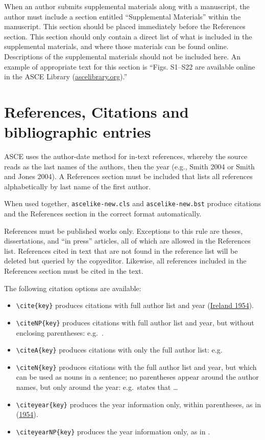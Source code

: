\documentclass[
  NewProceedings,
  letterpaper]{./assets/ascelike-new}
\begin{document}
When an author submits supplemental materials along with a manuscript,
the author must include a section entitled ``Supplemental Materials''
within the manuscript. This section should be placed immediately before
the References section. This section should only contain a direct list
of what is included in the supplemental materials, and where those
materials can be found online. Descriptions of the supplemental
materials should not be included here. An example of appropriate text
for this section is ``Figs. S1--S22 are available online in the ASCE
Library (\href{http://ascelibrary.org/}{ascelibrary.org}).''

\hypertarget{references-citations-and-bibliographic-entries}{%
\section{References, Citations and bibliographic
entries}\label{references-citations-and-bibliographic-entries}}

ASCE uses the author-date method for in-text references, whereby the
source reads as the last names of the authors, then the year (e.g.,
Smith 2004 or Smith and Jones 2004). A References section must be
included that lists all references alphabetically by last name of the
first author.

When used together, \texttt{ascelike-new.cls} and
\texttt{ascelike-new.bst} produce citations and the References section
in the correct format automatically.

References must be published works only. Exceptions to this rule are
theses, dissertations, and ``in press'' articles, all of which are
allowed in the References list. References cited in text that are not
found in the reference list will be deleted but queried by the
copyeditor. Likewise, all references included in the References section
must be cited in the text.

The following citation options are available:

\begin{itemize}
\item
  \texttt{\textbackslash{}cite\{key\}} produces citations with full
  author list and year (\protect\hyperlink{ref-Ireland:1954a}{Ireland
  1954}).
\item
  \texttt{\textbackslash{}citeNP\{key\}} produces citations with full
  author list and year, but without enclosing parentheses: e.g.~.
\item
  \texttt{\textbackslash{}citeA\{key\}} produces citations with only the
  full author list: e.g.
\item
  \texttt{\textbackslash{}citeN\{key\}} produces citations with the full
  author list and year, but which can be used as nouns in a sentence; no
  parentheses appear around the author names, but only around the year:
  e.g.~states that \ldots{}
\item
  \texttt{\textbackslash{}citeyear\{key\}} produces the year information
  only, within parentheses, as in
  (\protect\hyperlink{ref-Ireland:1954a}{1954}).
\item
  \texttt{\textbackslash{}citeyearNP\{key\}} produces the year
  information only, as in .
\end{itemize}
\end{document}

